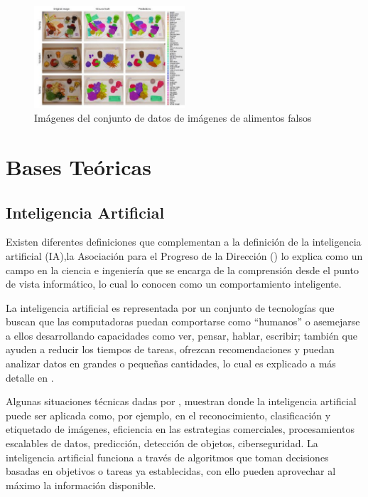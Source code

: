 \begin{figure}[h]
		\begin{center}
			\includegraphics[width=0.5\textwidth]{2/imagen2/22FIGURA22PAPER4.JPG}
	        \caption{ Imágenes del conjunto de datos de imágenes de alimentos falsos}
			\label{fig20}
		\end{center}
		
	\end{figure}

\section{Bases Teóricas}

\subsection{Inteligencia Artificial}

Existen diferentes definiciones que complementan a la definición de la inteligencia artificial (IA),la Asociación para el Progreso de la Dirección (\parencite{apda}) lo explica como un campo en la ciencia e ingeniería que se encarga de la comprensión desde el punto de vista informático, lo cual lo conocen como un comportamiento inteligente. 

La inteligencia artificial es representada por un conjunto de tecnologías que buscan que las computadoras puedan comportarse como “humanos” o asemejarse a ellos desarrollando capacidades como ver, pensar, hablar, escribir; también que ayuden a reducir los tiempos de tareas, ofrezcan recomendaciones y puedan analizar datos en grandes o pequeñas cantidades, lo cual es explicado a más detalle en \parencite{googlee}. 

Algunas situaciones técnicas dadas por \cite{Rouhiainen}, muestran donde la inteligencia artificial puede ser aplicada como, por ejemplo, en el reconocimiento, clasificación y etiquetado de imágenes, eficiencia en las estrategias comerciales, procesamientos escalables de datos, predicción, detección de objetos, ciberseguridad. La inteligencia artificial funciona a través de algoritmos que toman decisiones basadas en objetivos o tareas ya establecidas, con ello pueden aprovechar al máximo la información disponible. 


